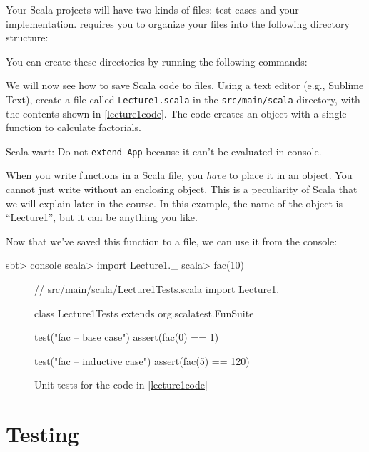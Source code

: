 \documentclass{book}
\begin{document}
Your Scala projects will have two kinds of files: test cases and your implementation.
\sbt{} requires you to organize your files into the following directory
structure:

You can create these directories by running the following commands:

We will now see how to save Scala code to files. Using a text editor
(e.g., Sublime Text), create a file called \verb|Lecture1.scala| in the
\verb|src/main/scala| directory, with the contents shown in \cref{lecture1code}.
The code creates an object with a single function to calculate factorials.

\begin{instructor}
Scala wart: Do not \verb|extend App| because it can't be evaluated in console.
\end{instructor}

When you write functions in a Scala file, you \emph{have} to place it in
an object. You cannot just write  without an enclosing
object. This is a peculiarity of Scala that we will explain later in the course.
In this example, the name of the object is ``Lecture1'', but it can be anything
you like.

Now that we've saved this function to a file, we can use it from the console:
%
\begin{console}
sbt> console
scala> import Lecture1._
scala> fac(10)
\end{console}

\begin{figure}
\begin{scalacode}
// src/main/scala/Lecture1Tests.scala
import Lecture1._

class Lecture1Tests extends org.scalatest.FunSuite {

  test("fac -- base case") {
    assert(fac(0) == 1)
  }

  test("fac -- inductive case") {
    assert(fac(5) == 120)
  }

}
\end{scalacode}
\caption{Unit tests for the code in \cref{lecture1code}}
\label{lecture1tests}
\end{figure}

\section{Testing}
\end{document}
